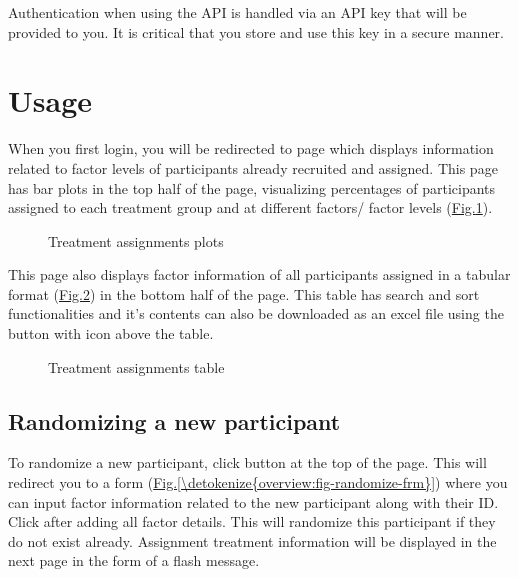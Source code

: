 \documentclass[letterpaper,10pt,english]{sphinxmanual}
\begin{document}
Authentication when using the API is handled via an API key that will be
provided to you. It is critical that you store and use this key in a secure
manner.


\section{Usage}
\label{\detokenize{overview:usage}}
When you first login, you will be redirected to  page which displays information related to factor levels
of participants already recruited and assigned. This page has bar plots in the top half of the page, visualizing percentages
of participants assigned to each treatment group and at different factors/ factor levels (\hyperref[\detokenize{overview:fig-assgmt-plot}]{Fig.\@ \ref{\detokenize{overview:fig-assgmt-plot}}}).

\begin{figure}[htbp]
\centering
\capstart

\noindent{}
\caption{Treatment assignments plots}\label{\detokenize{overview:id1}}\label{\detokenize{overview:fig-assgmt-plot}}\end{figure}

This page also displays factor information of all participants assigned in a tabular format (\hyperref[\detokenize{overview:fig-assgmt-tbl}]{Fig.\@ \ref{\detokenize{overview:fig-assgmt-tbl}}})
in the bottom half of the page. This table has search and sort functionalities and it’s contents can also be downloaded
as an excel file using the button with  icon above the table.

\begin{figure}[htbp]
\centering
\capstart

\noindent{}
\caption{Treatment assignments table}\label{\detokenize{overview:id2}}\label{\detokenize{overview:fig-assgmt-tbl}}\end{figure}


\subsection{Randomizing a new participant}
\label{\detokenize{overview:randomizing-a-new-participant}}
To randomize a new participant, click  button at the top of the page. This will redirect you to a
form (\hyperref[\detokenize{overview:fig-randomize-frm}]{Fig.\@ \ref{\detokenize{overview:fig-randomize-frm}}}) where you can input factor information related to the new participant along with their ID. Click  after
adding all factor details. This will randomize this participant if they do not exist already. Assignment treatment
information will be displayed in the next page in the form of a flash message.
\end{document}
